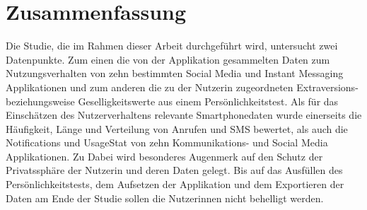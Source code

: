 \section{Zusammenfassung}
\label{ch:Entwurf:sec:zusammenfassung}

Die Studie, die im Rahmen dieser Arbeit durchgeführt wird, untersucht zwei Datenpunkte.
Zum einen die von der Applikation gesammelten Daten zum Nutzungsverhalten von zehn bestimmten Social Media und Instant Messaging Applikationen
und zum anderen die zu der Nutzerin zugeordneten Extraversions- beziehungsweise Geselligkeitswerte aus einem Persönlichkeitstest.
Als für das Einschätzen des Nutzerverhaltens relevante Smartphonedaten wurde einerseits die Häufigkeit, Länge und Verteilung von  Anrufen und SMS bewertet,
als auch die Notifications und UsageStat von zehn Kommunikations- und Social Media Applikationen.
Zu 
Dabei wird besonderes Augenmerk auf den Schutz der Privatssphäre der Nutzerin und deren Daten gelegt.
Bis auf das Ausfüllen des Persönlichkeitstests, dem Aufsetzen der Applikation und dem Exportieren der Daten am Ende der Studie sollen die Nutzerinnen nicht behelligt werden.



